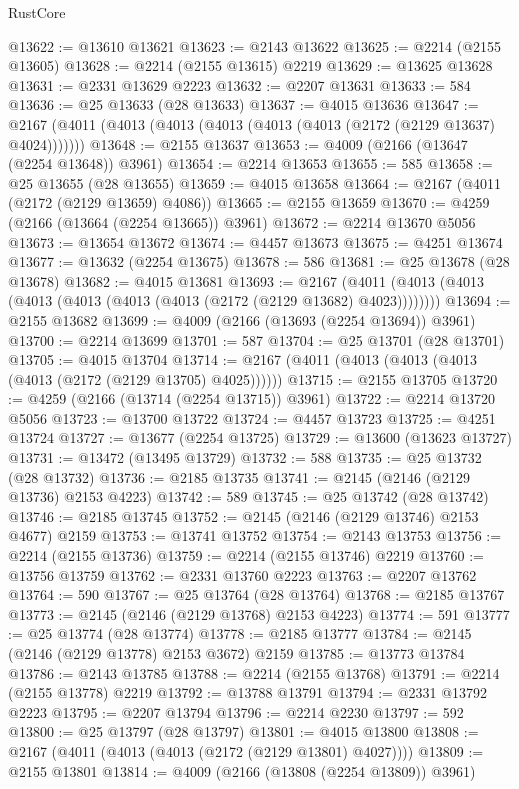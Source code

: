 \begin{lexlean}{RustCore}
\begin{coremodule}
@13622 := @13610 @13621
@13623 := @2143 @13622
@13625 := @2214 (@2155 @13605)
@13628 := @2214 (@2155 @13615) @2219
@13629 := @13625 @13628
@13631 := @2331 @13629 @2223
@13632 := @2207 @13631
@13633 := 584
@13636 := @25 @13633 (@28 @13633)
@13637 := @4015 @13636
@13647 := @2167 (@4011 (@4013 (@4013 (@4013 (@4013 (@4013 (@2172 (@2129 @13637) @4024)))))))
@13648 := @2155 @13637
@13653 := @4009 (@2166 (@13647 (@2254 @13648)) @3961)
@13654 := @2214 @13653
@13655 := 585
@13658 := @25 @13655 (@28 @13655)
@13659 := @4015 @13658
@13664 := @2167 (@4011 (@2172 (@2129 @13659) @4086))
@13665 := @2155 @13659
@13670 := @4259 (@2166 (@13664 (@2254 @13665)) @3961)
@13672 := @2214 @13670 @5056
@13673 := @13654 @13672
@13674 := @4457 @13673
@13675 := @4251 @13674
@13677 := @13632 (@2254 @13675)
@13678 := 586
@13681 := @25 @13678 (@28 @13678)
@13682 := @4015 @13681
@13693 := @2167 (@4011 (@4013 (@4013 (@4013 (@4013 (@4013 (@4013 (@2172 (@2129 @13682) @4023))))))))
@13694 := @2155 @13682
@13699 := @4009 (@2166 (@13693 (@2254 @13694)) @3961)
@13700 := @2214 @13699
@13701 := 587
@13704 := @25 @13701 (@28 @13701)
@13705 := @4015 @13704
@13714 := @2167 (@4011 (@4013 (@4013 (@4013 (@4013 (@2172 (@2129 @13705) @4025))))))
@13715 := @2155 @13705
@13720 := @4259 (@2166 (@13714 (@2254 @13715)) @3961)
@13722 := @2214 @13720 @5056
@13723 := @13700 @13722
@13724 := @4457 @13723
@13725 := @4251 @13724
@13727 := @13677 (@2254 @13725)
@13729 := @13600 (@13623 @13727)
@13731 := @13472 (@13495 @13729)
@13732 := 588
@13735 := @25 @13732 (@28 @13732)
@13736 := @2185 @13735
@13741 := @2145 (@2146 (@2129 @13736) @2153 @4223)
@13742 := 589
@13745 := @25 @13742 (@28 @13742)
@13746 := @2185 @13745
@13752 := @2145 (@2146 (@2129 @13746) @2153 @4677) @2159
@13753 := @13741 @13752
@13754 := @2143 @13753
@13756 := @2214 (@2155 @13736)
@13759 := @2214 (@2155 @13746) @2219
@13760 := @13756 @13759
@13762 := @2331 @13760 @2223
@13763 := @2207 @13762
@13764 := 590
@13767 := @25 @13764 (@28 @13764)
@13768 := @2185 @13767
@13773 := @2145 (@2146 (@2129 @13768) @2153 @4223)
@13774 := 591
@13777 := @25 @13774 (@28 @13774)
@13778 := @2185 @13777
@13784 := @2145 (@2146 (@2129 @13778) @2153 @3672) @2159
@13785 := @13773 @13784
@13786 := @2143 @13785
@13788 := @2214 (@2155 @13768)
@13791 := @2214 (@2155 @13778) @2219
@13792 := @13788 @13791
@13794 := @2331 @13792 @2223
@13795 := @2207 @13794
@13796 := @2214 @2230
@13797 := 592
@13800 := @25 @13797 (@28 @13797)
@13801 := @4015 @13800
@13808 := @2167 (@4011 (@4013 (@4013 (@2172 (@2129 @13801) @4027))))
@13809 := @2155 @13801
@13814 := @4009 (@2166 (@13808 (@2254 @13809)) @3961)

\end{coremodule}
\end{lexlean}
